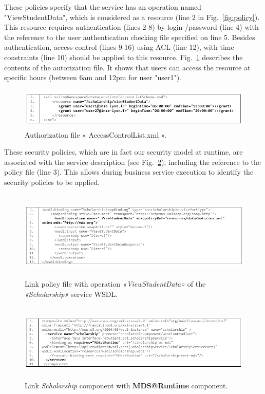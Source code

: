 \documentclass[runningheads,a4paper]{llncs}
\begin{document}
 
 
These policies specify that the service has an operation named "ViewStudentData", which is considered as a resource (line 2 in Fig.~\ref{fig:policy}). This resource requires authentication (lines 2-8) by login /password (line 4) with the reference to the user authentication checking file specified on line 5. Besides authentication, access control (lines 9-16) using ACL (line 12), with time constraints (line 10) should be applied to this resource. Fig.~\ref{fig:acl} describes the contents of the  autorization file. It shows that users can access the resource at specific hours (between 6am and 12pm for user "user1").
 
 
\begin{figure}
\centering
\includegraphics[height=55pt, width=380pt]{scholarshipAcl.png}
\caption{Authorization file « AccessControlList.xml ».}
\label{fig:acl}
\end{figure}


These security policies, which are in fact our security model at runtime, are associated with the service description (see Fig.~\ref{fig:wsdl}), including the reference to the policy file (line 3). This allows during business service execution to identify the security policies to be applied.
\begin{figure}  
\centering
\includegraphics[height=120pt, width=380pt]{scholarshipWSDL.png}
\caption{Link policy file with operation \emph{«ViewStudentData»} of the \emph{«Scholarship»} service WSDL.}
\label{fig:wsdl}
\end{figure}

\begin{figure}  
\center
\includegraphics[height=105pt,width=380pt]{scholarshipComposite.png}
\caption{Link \emph{Scholarship} component with \textbf{MDS@Runtime} component.}
\label{fig:gestionEtudiant}
\end{figure}
\end{document}
